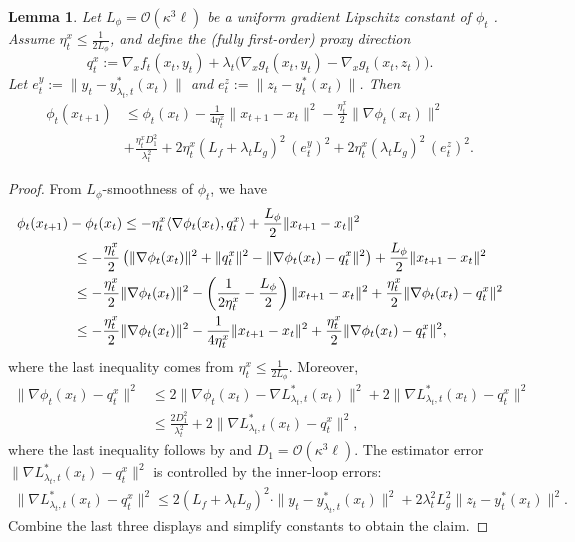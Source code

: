 \documentclass{uai2026} %
\newtheorem{lemma}{Lemma}[section]
\begin{document}
\begin{lemma}\label{lem:descent_phi}
Let $L_{\phi}=\mathcal{O}(\kappa^{3}\ell)$ be a uniform gradient Lipschitz constant of $\phi_{t}$ \citep[Lemma 4.4]{chen2024finding}.
Assume $\eta_t^x\le \frac{1}{2L_\phi}$, and define the (fully first-order) proxy direction
\[
q_t^{x}:=\nabla_{x}f_{t}(x_{t},y_{t})+\lambda_{t}\big(\nabla_{x}g_{t}(x_{t},y_{t})-\nabla_{x}g_{t}(x_{t},z_{t})\big).
\]
Let $e_t^y:=\|y_t-y^{*}_{\lambda_{t},t}(x_t)\|$ and $e_t^z:=\|z_t-y^{*}_{t}(x_t)\|$. Then
    \begin{align}
        \phi_{t}(x_{t+1})&\le \phi_{t}(x_{t})-\frac{1}{4\eta_{t}^{x}}\|x_{t+1}-x_{t}\|^{2}-\frac{\eta_{t}^{x}}{2}\|\nabla \phi_{t}(x_{t})\|^{2}\nonumber\\
        &+ \frac{\eta_{t}^{x}D_{1}^{2}}{\lambda_{t}^{2}}
        +2\eta_{t}^{x}(L_{f}+\lambda_{t}L_{g})^{2}\,(e_t^y)^{2}
        +2\eta_{t}^{x}(\lambda_{t}L_{g})^{2}\,(e_t^z)^{2}.
    \end{align}
\end{lemma}
\begin{proof}
From $L_{\phi}$-smoothness of $\phi_{t}$, we have
    \begin{align}
        \MoveEqLeft[4]\phi_{t}(x_{t+1})-\phi_{t}(x_{t})\le -\eta_{t}^{x}\langle \nabla\phi_{t}(x_{t}),q_{t}^{x}\rangle+\frac{L_{\phi}}{2}\|x_{t+1}-x_{t}\|^{2}\nonumber\\
        &\le -\frac{\eta_{t}^{x}}{2}\left(\|\nabla\phi_{t}(x_{t})\|^{2}+\|q_{t}^{x}\|^{2}-\|\nabla\phi_{t}(x_{t})-q_{t}^{x}\|^{2}\right)+\frac{L_{\phi}}{2}\|x_{t+1}-x_{t}\|^{2}\nonumber\\
        & \le -\frac{\eta_{t}^{x}}{2}\|\nabla\phi_{t}(x_{t})\|^{2}-\left(\frac{1}{2\eta_{t}^{x}}-\frac{L_{\phi}}{2}\right)\|x_{t+1}-x_{t}\|^{2}+\frac{\eta_{t}^{x}}{2}\|\nabla\phi_{t}(x_{t})-q_{t}^{x}\|^{2}\nonumber\\
        &\le -\frac{\eta_{t}^{x}}{2}\|\nabla\phi_{t}(x_{t})\|^{2}-\frac{1}{4\eta_{t}^{x}}\|x_{t+1}-x_{t}\|^{2}+\frac{\eta_{t}^{x}}{2}\|\nabla\phi_{t}(x_{t})-q_{t}^{x}\|^{2},
    \end{align}
    where the last inequality comes from $\eta_{t}^{x}\le \frac{1}{2L_{\phi}}$. Moreover, 
    \begin{align}
        \|\nabla\phi_{t}(x_{t})-q_{t}^{x}\|^{2}&\le 2\|\nabla\phi_{t}(x_{t})-\nabla L_{\lambda_{t},t}^{*}(x_{t})\|^{2}+2\|\nabla L_{\lambda_{t},t}^{*}(x_{t})-q_{t}^{x}\|^{2}\nonumber\\
        &\le \frac{2D_{1}^{2}}{\lambda^{2}_{t}}+2\|\nabla L_{\lambda_{t},t}^{*}(x_{t})-q_{t}^{x}\|^{2},
    \end{align}
    where the last inequality follows by  and $D_{1}=\mathcal{O}(\kappa^{3}\ell)$.
    The estimator error $\|\nabla L_{\lambda_{t},t}^{*}(x_{t})-q_{t}^{x}\|^{2}$ is controlled by the inner-loop errors:
\begin{align}
\|\nabla L_{\lambda_{t},t}^{*}(x_{t})-q_{t}^{x}\|^{2}
\le 2(L_{f}+\lambda_{t} L_g)^{2}\cdot\|y_t-y^{*}_{\lambda_{t},t}(x_t)\|^{2}+2\lambda_{t}^{2} L_g^{2}\|z_t-y^{*}_{t}(x_t)\|^{2}.
\end{align}
Combine the last three displays and simplify constants to obtain the claim.
\end{proof}
\end{document}
